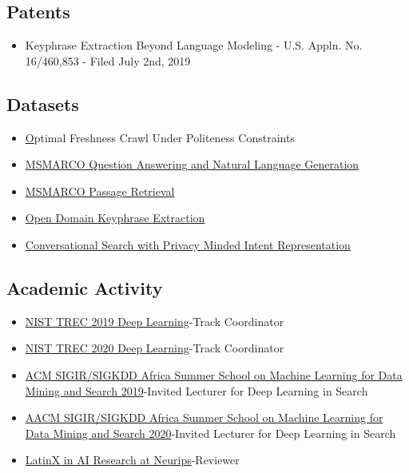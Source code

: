 \documentclass[line,margin]{res}
\begin{document}
\begin{resume}
\subsection{Patents}
\begin{itemize}
\itemsep -5pt
\item Keyphrase Extraction Beyond Language Modeling - U.S. Appln. No. 16/460,853 - Filed July 2nd, 2019
\end{itemize}
\subsection{Datasets}
\begin{itemize} 
\itemsep -5pt
\item \href{https://github.com/microsoft/MSMARCO-Optimal-Freshness-Crawl-Under-Politeness-Constraints}Optimal Freshness Crawl Under Politeness Constraints
\item \href{https://github.com/microsoft/MSMARCO-Question-Answering}{MSMARCO Question Answering and Natural Language Generation}
\item \href{https://github.com/microsoft/MSMARCO-Passage-Ranking}{MSMARCO Passage Retrieval}
\item \href{https://github.com/microsoft/OpenKP}{Open Domain Keyphrase Extraction}
\item \href{https://github.com/microsoft/MSMARCO-Conversational-Search}{Conversational Search with Privacy Minded Intent Representation}
\end{itemize}
\subsection{Academic Activity}
\begin{itemize} 
\itemsep -5pt
\item  \href{https://trec.nist.gov/pubs/call2019.html}{NIST TREC 2019 Deep Learning}-Track Coordinator
\item  \href{https://trec.nist.gov/pubs/call2020.html}{NIST TREC 2020 Deep Learning}-Track Coordinator
\item \href{http://sigir.org/afirm2019/}{ACM SIGIR/SIGKDD Africa Summer School on Machine Learning for Data Mining and Search 2019}-Invited Lecturer for Deep Learning in Search
\item \href{http://sigir.org/afirm2020/}{AACM SIGIR/SIGKDD Africa Summer School on Machine Learning for Data Mining and Search 2020}-Invited Lecturer for Deep Learning in Search
\item \href{http://www.latinxinai.org/neurips-2019}{LatinX in AI Research at Neurips}-Reviewer
\end{itemize}
\end{resume}
\end{document}
